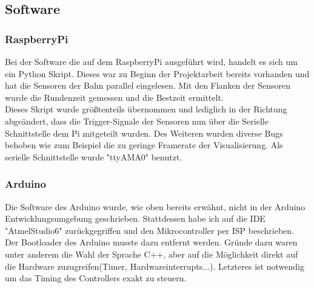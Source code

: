 \documentclass[a4paper, 11pt]{scrartcl}
\begin{document}
	\subsection{Software}
		\subsubsection{RaspberryPi}
			Bei der Software die auf dem RaspberryPi ausgeführt wird, handelt es sich um ein Python Skript. Dieses war zu Beginn der Projektarbeit bereits vorhanden und hat die Sensoren der Bahn parallel eingelesen. Mit den Flanken der Sensoren wurde die Rundenzeit gemessen und die Bestzeit ermittelt.\\
			Dieses Skript wurde größtenteils übernommen und lediglich in der Richtung abgeändert, dass die Trigger-Signale der Sensoren nun über die Serielle Schnittstelle dem Pi mitgeteilt wurden. Des Weiteren wurden diverse Bugs behoben wie zum Beispiel die zu geringe Framerate der Visualisierung. Als serielle Schnittstelle wurde "ttyAMA0" benutzt.
		\newpage	
		\subsubsection{Arduino}
			Die Software des Arduino wurde, wie oben bereits erwähnt, nicht in der Arduino Entwicklungsumgebung geschrieben. Stattdessen habe ich auf die IDE "AtmelStudio6" zurückgegriffen und den Mikrocontroller per ISP beschrieben. Der Bootloader des Arduino musste dazu entfernt werden.
			Gründe dazu waren unter anderem die Wahl der Sprache C++, aber auf die Möglichkeit direkt auf die Hardware zuzugreifen(Timer, Hardwareinterrupts...). Letzteres ist notwendig um das Timing des Controllers exakt zu steuern.\\
			
\end{document}
